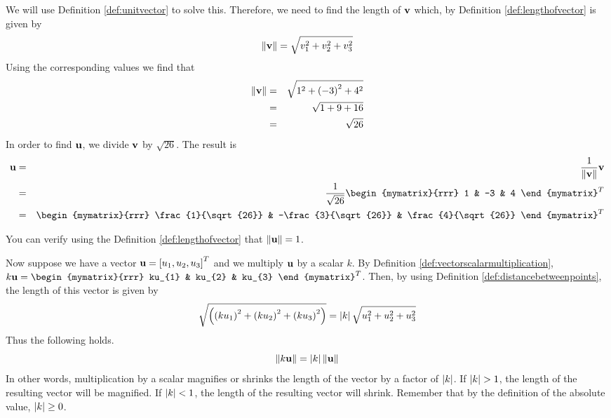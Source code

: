 \begin{solution}
We will use Definition \ref{def:unitvector} to solve this. 
Therefore, we need to find the length of $\mbox{\bf v}$ which, by Definition \ref{def:lengthofvector}
is given by 
\begin{equation*}
\|
\mbox{\bf v}
\|
= \sqrt{ v_{1}^2 + v_{2}^2+ v_{3}^2}
\end{equation*}
Using the corresponding  values we find that
\begin{eqnarray*}
\|
\mbox{\bf v}
\|
&=& \sqrt{ 1^2 + \left(-3 \right)^2 + 4^2} \\
&=& \sqrt{ 1 + 9 + 16} \\
&=& \sqrt{26} 
\end{eqnarray*}
In order to find $\mbox{\bf u}$, we divide $\mbox{\bf v}$ by $\sqrt{26}$.
The result is 
\begin{eqnarray*}
\vect{u}
&=&
\frac{1}{\norm{\vect{v}}}
\vect{v} \\
&=&
\frac{1}{\sqrt{26}}
\begin{mymatrix}{rrr}
1 & -3 & 4
\end{mymatrix}^T \\
&=&
\begin{mymatrix}{rrr}
\frac{1}{\sqrt{26}} & -\frac{3}{\sqrt{26}} & \frac{4}{\sqrt{26}}
\end{mymatrix}^T
\end{eqnarray*}

You can verify using the Definition \ref{def:lengthofvector} that $\|\mbox{\bf u}\| = 1 $. 
\end{solution}



Now suppose we have a vector $\mbox{\bf u} = \left[u_1, u_2, u_3\right]^T$ and we
multiply $\mbox{\bf u}$ by a scalar $k$. By Definition
\ref{def:vectorscalarmultiplication},
$k\vect{u} = \begin{mymatrix}{rrr} ku_{1} & ku_{2} & ku_{3}
\end{mymatrix}^T $. 
Then, by using Definition \ref{def:distancebetweenpoints}, the length of this vector is given by 
\begin{equation*}
\sqrt{\left(\left(k u_{1}\right) ^{2}+\left(k u_{2}\right)
^{2}+\left(k u_{3}\right) ^{2}\right) }=\left|k \right|\sqrt{u_{1}^{2}+u_{2}^{2}+u_{3}^{2}}
\end{equation*}
Thus the following holds.
\begin{equation*}
\|k \mbox{\bf u}\| =\left|k \right|\|\mbox{\bf u}\| 
\end{equation*}
In other words, multiplication by a scalar magnifies or shrinks the
length of the vector by a factor of $\left|k\right|$.  If $\abs{k}> 1$, the
length of the resulting vector will be magnified. If $\left|k\right|<1$, the
length of the resulting vector will shrink. Remember that by the
definition of the absolute value, $\left|k\right|\geq 0$.



